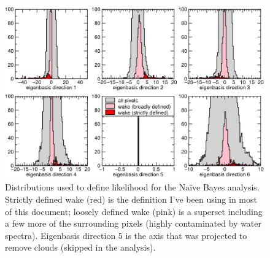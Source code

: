 \documentclass[12pt]{article}
\begin{document}
\begin{figure}
\begin{center}
\includegraphics[width=\linewidth]{plot_naivebayes_with_pca.png}
\end{center}
\caption{Distributions used to define likelihood for the Na\"ive Bayes analysis.  Strictly defined wake (red) is the definition I've been using in most of this document; loosely defined wake (pink) is a superset including a few more of the surrounding pixels (highly contaminated by water spectra).  Eigenbasis direction 5 is the axis that was projected to remove clouds (skipped in the analysis). \label{plot_naivebayes_with_pca}}
\end{figure}
\end{document}
